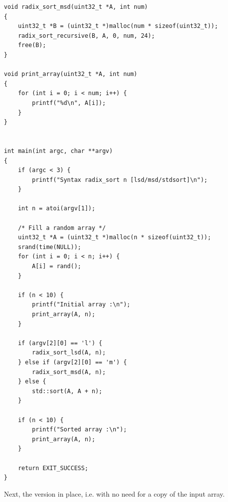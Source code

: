 \documentclass[12pt]{article}
\theoremstyle{plain}
\theoremstyle{remark}
\begin{document}
\begin{lstlisting}[style=C]
void radix_sort_msd(uint32_t *A, int num)
{
	uint32_t *B = (uint32_t *)malloc(num * sizeof(uint32_t));
	radix_sort_recursive(B, A, 0, num, 24);
	free(B);
}

void print_array(uint32_t *A, int num)
{
	for (int i = 0; i < num; i++) {
		printf("%d\n", A[i]);
	}
}


int main(int argc, char **argv)
{
	if (argc < 3) {
		printf("Syntax radix_sort n [lsd/msd/stdsort]\n");
	}

	int n = atoi(argv[1]);

	/* Fill a random array */
	uint32_t *A = (uint32_t *)malloc(n * sizeof(uint32_t));
	srand(time(NULL));
	for (int i = 0; i < n; i++) {
		A[i] = rand();
	}

	if (n < 10) {
		printf("Initial array :\n");
		print_array(A, n);
	}

	if (argv[2][0] == 'l') {
		radix_sort_lsd(A, n);
	} else if (argv[2][0] == 'm') {
		radix_sort_msd(A, n);
	} else {
		std::sort(A, A + n);
	}

	if (n < 10) {
		printf("Sorted array :\n");
		print_array(A, n);
	}

	return EXIT_SUCCESS;
}
\end{lstlisting}

Next, the version in place, i.e. with no need for a copy of the input array.
\end{document}
